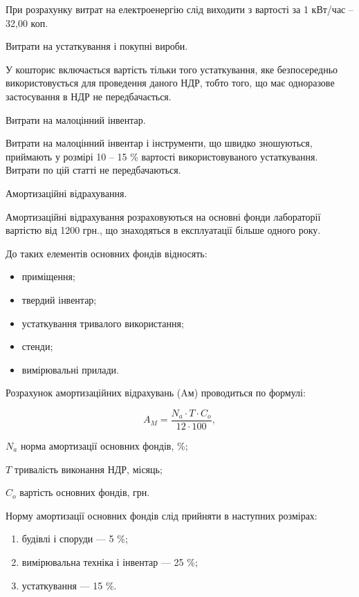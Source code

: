 При розрахунку витрат на електроенергію слід виходити з вартості за 1 кВт/час – 32,00 коп.

Витрати на устаткування і покупні вироби. 

У кошторис включається вартість тільки того устаткування, яке безпосередньо використовується для проведення даного НДР, тобто того, що має одноразове застосування в НДР не передбачається.

Витрати на малоцінний інвентар. 

Витрати на малоцінний інвентар і інструменти, що швидко зношуються, приймають у розмірі 10 – 15 \% вартості використовуваного устаткування. Витрати по цій статті не передбачаються.

Амортизаційні відрахування.

Амортизаційні відрахування розраховуються на основні фонди лабораторії вартістю від 1200 грн., що знаходяться в експлуатації більше одного року.

До таких елементів основних фондів відносять:
\begin{itemize}
\item приміщення;
\item твердий інвентар;
\item устаткування тривалого використання;
\item стенди;
\item вимірювальні прилади.
\end{itemize}

Розрахунок амортизаційних відрахувань (Aм) проводиться по формулі:

\begin{equation}
A_M = \frac{N_a   \cdot   T   \cdot   C_o}{12  \cdot  100}, \nonumber
\end{equation}

\begin{formulaDescription}
\item [$N_a$] норма амортизації основних фондів, \%;
\item [$T$] тривалість виконання НДР, місяць;
\item [$C_o$] вартість основних фондів, грн.
\end{formulaDescription}

Норму амортизації основних фондів слід прийняти в наступних розмірах:

\begin{enumerate}
\item будівлі і споруди --- 5 \%;
\item вимірювальна техніка і інвентар --- 25 \%;
\item устаткування --- 15 \%.
\end{enumerate}

